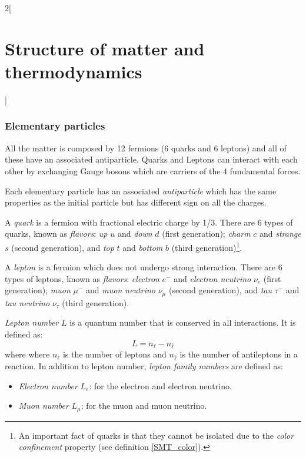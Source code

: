 \documentclass[../../../main_physics.tex]{subfiles}
\begin{document}
\begin{multicols}{2}[\section{Structure of matter and thermodynamics}]
  \subsubsection{Elementary particles}
  \begin{definition}
    All the matter is composed by 12 fermions (6 quarks and 6 leptons) and all of these have an associated antiparticle. Quarks and Leptons can interact with each other by exchanging Gauge bosons which are carriers of the 4 fundamental forces.
  \end{definition}
  \begin{definition}[Antimatter]
    Each elementary particle has an associated \emph{antiparticle} which has the same properties as the initial particle but has different sign on all the charges.
  \end{definition}
  \begin{definition}[Quark]
    A \emph{quark} is a fermion with fractional electric charge by 1/3. There are 6 types of quarks, known as \emph{flavors}: \emph{up} $u$ and \emph{down} $d$ (first generation); \emph{charm} $c$ and \emph{strange} $s$ (second generation), and \emph{top} $t$ and \emph{bottom} $b$ (third generation)\footnote{An important fact of quarks is that they cannot be isolated due to the \emph{color confinement} property (see definition \cref{SMT_color}).}.
  \end{definition}
  \begin{definition}[Lepton]
    A \emph{lepton} is a fermion which does not undergo strong interaction. There are 6 types of leptons, known as \emph{flavors}: \emph{electron} $e^-$ and \emph{electron neutrino} $\nu_e$ (first generation); \emph{muon} $\mu^-$ and \emph{muon neutrino} $\nu_\mu$ (second generation), and \emph{tau} $\tau^-$ and \emph{tau neutrino} $\nu_\tau$ (third generation).
  \end{definition}
  \begin{definition}
    \emph{Lepton number} $L$ is a quantum number that is conserved in all interactions. It is defined as: $$L=n_\ell-n_{\bar{\ell}}$$ where where  $n_\ell$ is the number of leptons and $n_{\bar{\ell}}$ is the number of antileptons in a reaction. In addition to lepton number, \emph{lepton family numbers} are defined as:
    \begin{itemize}
      \item \emph{Electron number} $L_e$: for the electron and electron neutrino.
      \item \emph{Muon number} $L_\mu$: for the muon and muon neutrino.

\end{itemize}
\end{definition}
\end{multicols}
\end{document}
